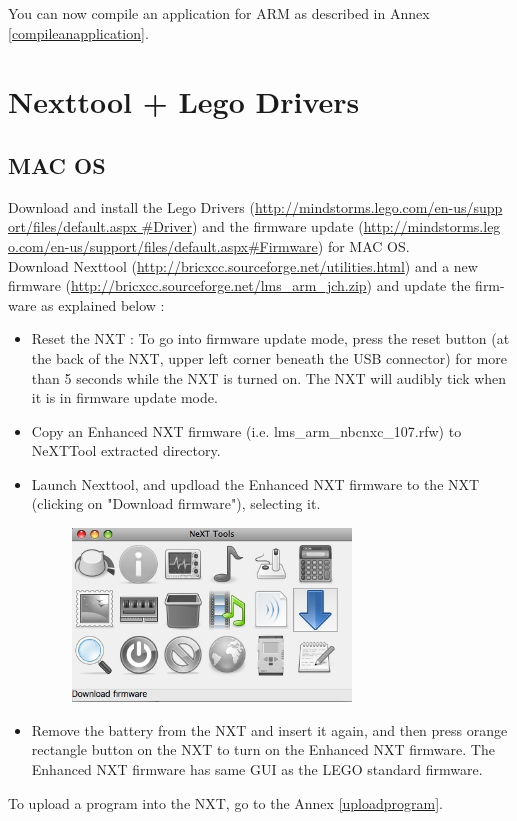 \documentclass[10pt]{article}
\begin{document}
You can now compile an application for ARM as described in Annex \ref{compileanapplication}.

\section{Nexttool + Lego Drivers} \label{drivers}
\subsection{MAC OS}
Download and install the Lego Drivers (\href{http://mindstorms.lego.com/en-us/support/files/default.aspx#Driver}{http://mindstorms.lego.com/en-us/supp ort/files/default.aspx
\#Driver}) and the firmware update (\href{http://mindstorms.lego.com/en-us/support/files/default.aspx#Firmware}{http://mindstorms.leg o.com/en-us/support/files/default.aspx\#Firmware}) for MAC OS. \\
Download Nexttool (\href{http://bricxcc.sourceforge.net/utilities.html}{http://bricxcc.sourceforge.net/utilities.html}) and a new firmware (\href{http://bricxcc.sourceforge.net/lms_arm_jch.zip}{http://bricxcc.sourceforge.net/lms\_arm\_jch.zip}) and update the firm-ware as explained below :
\begin{itemize}
\item Reset the NXT : To go into firmware update mode, press the reset button (at the back of the NXT, upper left corner beneath the USB connector) for more than 5 seconds while the NXT is turned on. The NXT will audibly tick when it is in firmware update mode.
\item Copy an Enhanced NXT firmware (i.e. lms\_arm\_nbcnxc\_107.rfw) to NeXTTool extracted directory.
\item Launch Nexttool, and updload the Enhanced NXT firmware to the NXT (clicking on "Download firmware"), selecting it.
	\begin{figure}[h] %
   		\centering
		\includegraphics[width=0.7\textwidth]{pictures/firmware.jpg}
	\end{figure}
\item Remove the battery from the NXT and insert it again, and then press orange rectangle button on the NXT to turn on the Enhanced NXT firmware. The Enhanced NXT firmware has same GUI as the LEGO standard firmware.
\end{itemize}
To upload a program into the NXT, go to the Annex \ref{uploadprogram}.
\end{document}
